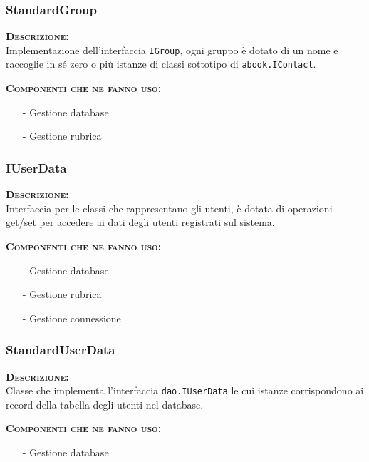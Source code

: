 \subsubsection{StandardGroup}
\begin{description}
	\item{\scshape\bfseries Descrizione:}\\
Implementazione dell'interfaccia \texttt{IGroup}, ogni gruppo è dotato di un nome e raccoglie in sé zero o più istanze di classi sottotipo di \texttt{abook.IContact}.
	\item{\scshape\bfseries Componenti che ne fanno uso:}
	  \begin{itemize}[noitemsep,nolistsep]
	    \item[-] Gestione database
	    \item[-] Gestione rubrica
	  \end{itemize}
\end{description}

\subsubsection{IUserData}
\begin{description}
	\item{\scshape\bfseries Descrizione:}\\
Interfaccia per le classi che rappresentano gli utenti, è dotata di operazioni get/set per accedere ai dati degli utenti registrati sul sistema.
	\item{\scshape\bfseries Componenti che ne fanno uso:}
	\begin{itemize}[noitemsep,nolistsep]
	  \item[-] Gestione database
	  \item[-] Gestione rubrica
	  \item[-] Gestione connessione
	\end{itemize}
\end{description}

\subsubsection{StandardUserData}
\begin{description}
	\item{\scshape\bfseries Descrizione:}\\
Classe che implementa l'interfaccia \texttt{dao.IUserData} le cui istanze corrispondono ai record della tabella degli utenti nel database.
	\item{\scshape\bfseries Componenti che ne fanno uso:}
	\begin{itemize}[noitemsep,nolistsep]
	  \item[-] Gestione database
	\end{itemize}
\end{description}

